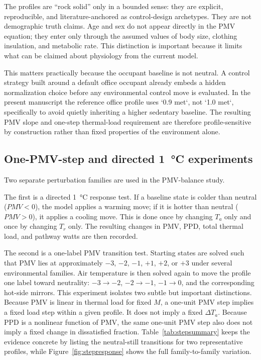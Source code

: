 \documentclass[preprint,authoryear,12pt]{elsarticle}
\begin{document}


The profiles are ``rock solid'' only in a bounded sense: they are explicit, reproducible, and literature-anchored as control-design archetypes. They are not demographic truth claims. Age and sex do not appear directly in the PMV equation; they enter only through the assumed values of body size, clothing insulation, and metabolic rate. This distinction is important because it limits what can be claimed about physiology from the current model.

This matters practically because the occupant baseline is not neutral. A control strategy built around a default office occupant already embeds a hidden normalization choice before any environmental control move is evaluated. In the present manuscript the reference office profile uses `0.9 met`, not `1.0 met`, specifically to avoid quietly inheriting a higher sedentary baseline. The resulting PMV slope and one-step thermal-load requirement are therefore profile-sensitive by construction rather than fixed properties of the environment alone.

\subsection{One-PMV-step and directed \SI{1}{\celsius} experiments}

Two separate perturbation families are used in the PMV-balance study.

The first is a directed \SI{1}{\celsius} response test. If a baseline state is colder than neutral ($PMV<0$), the model applies a warming move; if it is hotter than neutral ($PMV>0$), it applies a cooling move. This is done once by changing $T_a$ only and once by changing $T_r$ only. The resulting changes in PMV, PPD, total thermal load, and pathway watts are then recorded.

The second is a one-label PMV transition test. Starting states are solved such that PMV lies at approximately $-3$, $-2$, $-1$, $+1$, $+2$, or $+3$ under several environmental families. Air temperature is then solved again to move the profile one label toward neutrality: $-3 \rightarrow -2$, $-2 \rightarrow -1$, $-1 \rightarrow 0$, and the corresponding hot-side mirrors. This experiment isolates two subtle but important distinctions. Because PMV is linear in thermal load for fixed $M$, a one-unit PMV step implies a fixed load step within a given profile. It does not imply a fixed $\Delta T_a$. Because PPD is a nonlinear function of PMV, the same one-unit PMV step also does not imply a fixed change in dissatisfied fraction. Table~\ref{tab:stepsummary} keeps the evidence concrete by listing the neutral-still transitions for two representative profiles, while Figure~\ref{fig:stepresponse} shows the full family-to-family variation.
\end{document}
